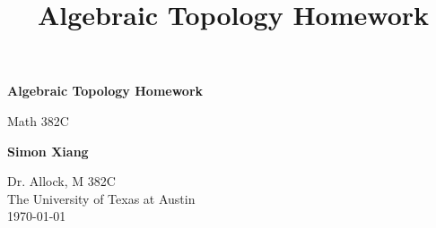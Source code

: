 \documentclass{article}
\title{Algebraic Topology Homework}
\begin{document}
\begin{titlepage}
    \begin{center}
        \vspace*{1cm}
 
        \Huge
        \textbf{Algebraic Topology Homework}
 
        \vspace{0.5cm}
        \LARGE
        Math 382C

        \vspace{1.5cm}
 
        \textbf{Simon Xiang}
 
        \vfill
  
        \vspace{0.8cm}
 
        \Large
    	Dr. Allock, M 382C\\
        The University of Texas at Austin\\
        \today
 
    \end{center}
\end{titlepage}
    
\end{document}
